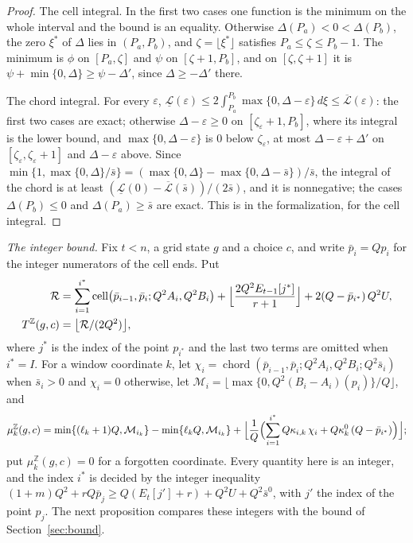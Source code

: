 \documentclass[11pt]{amsart}
\theoremstyle{definition}
\numberwithin{equation}{section}
\begin{document}
\begin{proof}
The cell integral. In the first two cases one function is the minimum on the whole interval and the bound is an equality. Otherwise $\Delta(P_a)<0<\Delta(P_b)$, the zero $\xi^*$ of $\Delta$ lies in $(P_a,P_b)$, and $\zeta=\lfloor\xi^*\rfloor$ satisfies $P_a\le\zeta\le P_b-1$. The minimum is $\phi$ on $[P_a,\zeta]$ and $\psi$ on $[\zeta+1,P_b]$, and on $[\zeta,\zeta+1]$ it is $\psi+\min\{0,\Delta\}\ge\psi-\Delta'$, since $\Delta\ge-\Delta'$ there.

The chord integral. For every $\varepsilon$, $\underline{\mathcal L}(\varepsilon)\le2\int_{P_a}^{P_b}\max\{0,\Delta-\varepsilon\}\,d\xi\le\overline{\mathcal L}(\varepsilon)$: the first two cases are exact; otherwise $\Delta-\varepsilon\ge0$ on $[\zeta_\varepsilon+1,P_b]$, where its integral is the lower bound, and $\max\{0,\Delta-\varepsilon\}$ is $0$ below $\zeta_\varepsilon$, at most $\Delta-\varepsilon+\Delta'$ on $[\zeta_\varepsilon,\zeta_\varepsilon+1]$ and $\Delta-\varepsilon$ above. Since $\min\{1,\max\{0,\Delta\}/\bar s\}=(\max\{0,\Delta\}-\max\{0,\Delta-\bar s\})/\bar s$, the integral of the chord is at least $(\underline{\mathcal L}(0)-\overline{\mathcal L}(\bar s))/(2\bar s)$, and it is nonnegative; the cases $\Delta(P_b)\le0$ and $\Delta(P_a)\ge\bar s$ are exact. This is  in the formalization, for the cell integral.
\end{proof}

\emph{The integer bound.} Fix $t<n$, a grid state $g$ and a choice $c$, and write $\bar p_i=Qp_i$ for the integer numerators of the cell ends. Put
\begin{align*}
\mathcal R&=\sum_{i=1}^{i^*}\operatorname{cell}\bigl(\bar p_{i-1},\bar p_i;Q^2A_i,Q^2B_i\bigr)+\Bigl\lfloor\frac{2Q^2E_{t-1}[j^*]}{r+1}\Bigr\rfloor+2(Q-\bar p_{i^*})\,Q^2U,\\
T^{\mathbb Z}(g,c)&=\bigl\lfloor\mathcal R/(2Q^2)\bigr\rfloor,
\end{align*}
where $j^*$ is the index of the point $p_{i^*}$ and the last two terms are omitted when $i^*=I$. For a window coordinate $k$, let $\chi_i=\operatorname{chord}(\bar p_{i-1},\bar p_i;Q^2A_i,Q^2B_i;Q^2\bar s_i)$ when $\bar s_i>0$ and $\chi_i=0$ otherwise, let $\mathcal M_i=\lfloor\max\{0,Q^2(B_i-A_i)(p_i)\}/Q\rfloor$, and
\[
\mu^{\mathbb Z}_k(g,c)=\min\{(\ell_k+1)Q,\mathcal M_{i_k}\}-\min\{\ell_kQ,\mathcal M_{i_k}\}+\Bigl\lfloor\frac1Q\Bigl(\sum_{i=1}^{i^*}Q\kappa_{i,k}\,\chi_i+Q\kappa^0_k\,(Q-\bar p_{i^*})\Bigr)\Bigr\rfloor;
\]
put $\mu^{\mathbb Z}_k(g,c)=0$ for a forgotten coordinate. Every quantity here is an integer, and the index $i^*$ is decided by the integer inequality $(1+m)Q^2+rQ\bar p_j\ge Q(E_t[j']+r)+Q^2U+Q^2\bar s^0$, with $j'$ the index of the point $p_j$. The next proposition compares these integers with the bound of Section~\ref{sec:bound}.
\end{document}
